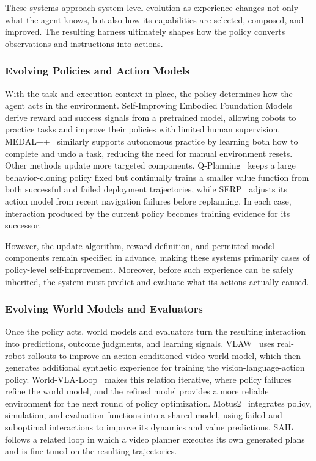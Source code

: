These systems approach system-level evolution as experience changes not only what the agent knows, but also how its capabilities are selected, composed, and improved. The resulting harness ultimately shapes how the policy converts observations and instructions into actions.

\subsubsection{Evolving Policies and Action Models}

With the task and execution context in place, the policy determines how the agent acts in the environment. Self-Improving Embodied Foundation Models~\cite{ghasemipour2025selfimproving} derive reward and success signals from a pretrained model, allowing robots to practice tasks and improve their policies with limited human supervision. MEDAL++~\cite{sharma2023selfimproving} similarly supports autonomous practice by learning both how to complete and undo a task, reducing the need for manual environment resets. Other methods update more targeted components. Q-Planning~\cite{giridhar2026qplanning} keeps a large behavior-cloning policy fixed but continually trains a smaller value function from both successful and failed deployment trajectories, while SERP~\cite{li2026serp} adjusts its action model from recent navigation failures before replanning. In each case, interaction produced by the current policy becomes training evidence for its successor. 

However, the update algorithm, reward definition, and permitted model components remain specified in advance, making these systems primarily cases of policy-level self-improvement. Moreover, before such experience can be safely inherited, the system must predict and evaluate what its actions actually caused.

\subsubsection{Evolving World Models and Evaluators}

Once the policy acts, world models and evaluators turn the resulting interaction into predictions, outcome judgments, and learning signals. VLAW~\cite{guo2026vlaw} uses real-robot rollouts to improve an action-conditioned video world model, which then generates additional synthetic experience for training the vision-language-action policy. World-VLA-Loop~\cite{liu2026worldvlaloop} makes this relation iterative, where policy failures refine the world model, and the refined model provides a more reliable environment for the next round of policy optimization. Motus2~\cite{bi2026motus2} integrates policy, simulation, and evaluation functions into a shared model, using failed and suboptimal interactions to improve its dynamics and value predictions. SAIL~\cite{luo2025sail} follows a related loop in which a video planner executes its own generated plans and is fine-tuned on the resulting trajectories. 

